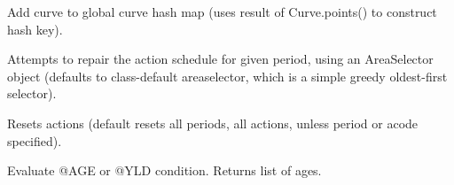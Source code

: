 \documentclass[letterpaper,10pt,english]{sphinxmanual}
\begin{document}
\begin{fulllineitems}
\begin{fulllineitems}
\end{fulllineitems}


\begin{fulllineitems}
\label{\detokenize{forest:forest.ForestModel.register_curve}}
Add curve to global curve hash map (uses result of Curve.points() to construct hash key).

\end{fulllineitems}


\begin{fulllineitems}
\label{\detokenize{forest:forest.ForestModel.repair_actions}}
Attempts to repair the action schedule for given period, using an AreaSelector object (defaults to class-default areaselector, which is a simple greedy oldest-first selector).

\end{fulllineitems}


\begin{fulllineitems}
\label{\detokenize{forest:forest.ForestModel.reset_actions}}
Resets actions (default resets all periods, all actions, unless period or acode specified).

\end{fulllineitems}


\begin{fulllineitems}
\label{\detokenize{forest:forest.ForestModel.resolve_append}}
\end{fulllineitems}


\begin{fulllineitems}
\label{\detokenize{forest:forest.ForestModel.resolve_condition}}
Evaluate @AGE or @YLD condition.
Returns list of ages.


\end{fulllineitems}
\end{fulllineitems}
\end{document}

